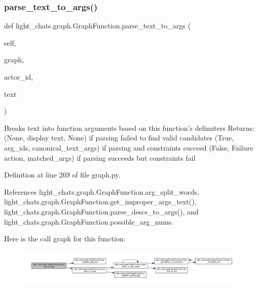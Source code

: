 \subsubsection{\texorpdfstring{parse\+\_\+text\+\_\+to\+\_\+args()}{parse\_text\_to\_args()}}
{\footnotesize\ttfamily def light\+\_\+chats.\+graph.\+Graph\+Function.\+parse\+\_\+text\+\_\+to\+\_\+args (\begin{DoxyParamCaption}\item[{}]{self,  }\item[{}]{graph,  }\item[{}]{actor\+\_\+id,  }\item[{}]{text }\end{DoxyParamCaption})}

\begin{DoxyVerb}Breaks text into function arguments based on this function's
delimiters
Returns:
(None, display text, None) if parsing failed to find valid candidates
(True, arg_ids, canonical_text_args) if parsing and constraints succeed
(False, Failure action, matched_args)
if parsing succeeds but constraints fail
\end{DoxyVerb}
 

Definition at line 269 of file graph.\+py.



References light\+\_\+chats.\+graph.\+Graph\+Function.\+arg\+\_\+split\+\_\+words, light\+\_\+chats.\+graph.\+Graph\+Function.\+get\+\_\+improper\+\_\+args\+\_\+text(), light\+\_\+chats.\+graph.\+Graph\+Function.\+parse\+\_\+descs\+\_\+to\+\_\+args(), and light\+\_\+chats.\+graph.\+Graph\+Function.\+possible\+\_\+arg\+\_\+nums.

Here is the call graph for this function\+:
\nopagebreak
\begin{figure}[H]
\begin{center}
\leavevmode
\includegraphics[width=350pt]{classlight__chats_1_1graph_1_1GraphFunction_a3b6764b365baf7471e53651adf83706b_cgraph}
\end{center}
\end{figure}
\mbox{\label{classlight__chats_1_1graph_1_1GraphFunction_a9769b13542f28f04977e374057bbc017}} 
